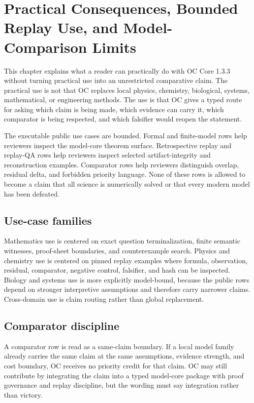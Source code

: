 \section{Practical Consequences, Bounded Replay Use, and Model-Comparison Limits}

\label{sec:oc-core-1-3-practical-utility}

This chapter explains what a reader can practically do with OC Core 1.3.3 without turning practical use into an unrestricted comparative claim. The practical use is not that OC replaces local physics, chemistry, biological, systems, mathematical, or engineering methods. The use is that OC gives a typed route for asking which claim is being made, which evidence can carry it, which comparator is being respected, and which falsifier would reopen the statement.


The executable public use cases are bounded. Formal and finite-model rows help reviewers inspect the model-core theorem surface. Retrospective replay and replay-QA rows help reviewers inspect selected artifact-integrity and reconstruction examples. Comparator rows help reviewers distinguish overlap, residual delta, and forbidden priority language. None of these rows is allowed to become a claim that all science is numerically solved or that every modern model has been defeated.


\subsection{Use-case families}

Mathematics use is centered on exact question terminalization, finite semantic witnesses, proof-sheet boundaries, and counterexample search. Physics and chemistry use is centered on pinned replay examples where formula, observation, residual, comparator, negative control, falsifier, and hash can be inspected. Biology and systems use is more explicitly model-bound, because the public rows depend on stronger interpretive assumptions and therefore carry narrower claims. Cross-domain use is claim routing rather than global replacement.


\subsection{Comparator discipline}

A comparator row is read as a same-claim boundary. If a local model family already carries the same claim at the same assumptions, evidence strength, and cost boundary, OC receives no priority credit for that claim. OC may still contribute by integrating the claim into a typed model-core package with proof governance and replay discipline, but the wording must say integration rather than victory.


